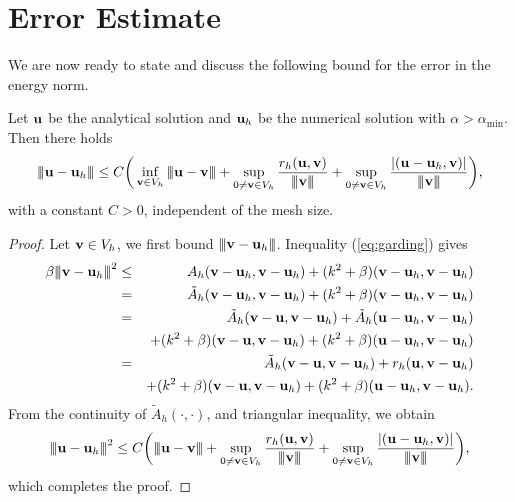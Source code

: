 \documentclass[final,leqno]{siamltex704}
\newcommand{\bv}{{\bf v}}
\def\bu{{\bf u}}
\def\bv{{\bf v}}
\def\3bar{{|\hspace{-.02in}|\hspace{-.02in}|}}
\begin{document}
\section{Error Estimate}
We are now ready to state and discuss the following bound for the error in the energy norm.
\begin{lemma}
Let $\bu$ be the analytical solution and $\bu_h$ be the numerical solution with $\alpha>\alpha_{\min}$. Then there holds
\begin{eqnarray}
\3bar\bu-\bu_h\3bar\le C\bigg(\inf_{\bv\in V_h}\3bar\bu-\bv\3bar+\sup_{0\neq\bv\in V_h}\frac{r_h(\bu,\bv)}{\3bar\bv\3bar}+\sup_{0\neq\bv\in V_h}\frac{|(\bu-\bu_h,\bv)|}{\3bar\bv\3bar}\bigg),
\end{eqnarray}
with a constant $C>0$, independent of the mesh size.
\end{lemma}
\begin{proof}
Let $\bv\in V_h$, we first bound $\3bar\bv-\bu_h\3bar$. Inequality (\ref{eq:garding}) gives
\begin{eqnarray*}
\beta\3bar\bv-\bu_h\3bar^2
%
&\le& A_h(\bv-\bu_h,\bv-\bu_h)+(k^2+\beta)(\bv-\bu_h,\bv-\bu_h)\\
%
&=& \tilde{A}_h(\bv-\bu_h,\bv-\bu_h)+(k^2+\beta)(\bv-\bu_h,\bv-\bu_h)\\
%
&=& \tilde{A}_h(\bv-\bu,\bv-\bu_h)+\tilde{A}_h(\bu-\bu_h,\bv-\bu_h)\\
&&+(k^2+\beta)(\bv-\bu,\bv-\bu_h)+(k^2+\beta)(\bu-\bu_h,\bv-\bu_h)\\
%
&=& \tilde{A}_h(\bv-\bu,\bv-\bu_h)+r_h(\bu,\bv-\bu_h)\\
&&+(k^2+\beta)(\bv-\bu,\bv-\bu_h)+(k^2+\beta)(\bu-\bu_h,\bv-\bu_h).
\end{eqnarray*}
From the continuity of $\tilde{A}_h(\cdot,\cdot)$, and triangular inequality, we obtain
\begin{eqnarray*}
\3bar\bu-\bu_h\3bar^2
%
\le C\bigg(\3bar\bu-\bv\3bar+\sup_{0\neq\bv\in V_h}\frac{r_h(\bu,\bv)}{\3bar\bv\3bar}
+\sup_{0\neq\bv\in V_h}\frac{|(\bu-\bu_h,\bv)|}{\3bar\bv\3bar}
\bigg),
\end{eqnarray*}
which completes the proof.
\end{proof}
\end{document}
